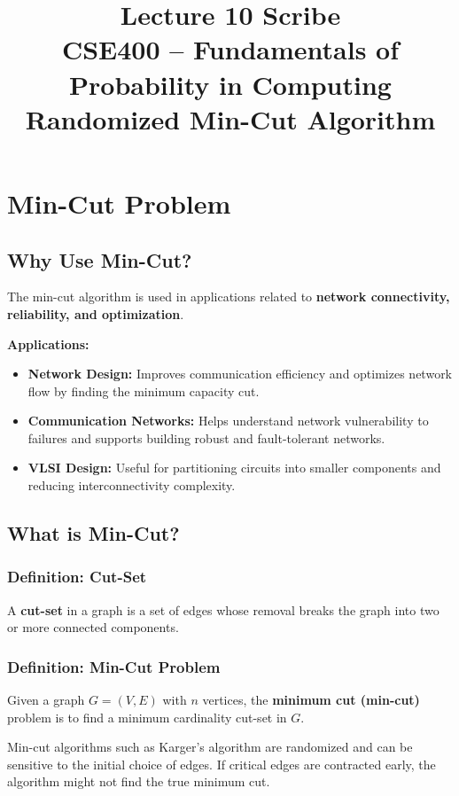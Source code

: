 \documentclass[12pt]{article}
\title{\textbf{Lecture 10 Scribe}\\
CSE400 -- Fundamentals of Probability in Computing\\
\large Randomized Min-Cut Algorithm}
\author{}
\date{}
\begin{document}
\maketitle

\section{Min-Cut Problem}

\subsection{Why Use Min-Cut?}

The min-cut algorithm is used in applications related to \textbf{network connectivity, reliability, and optimization}.

\textbf{Applications:}
\begin{itemize}
    \item \textbf{Network Design:} Improves communication efficiency and optimizes network flow by finding the minimum capacity cut.
    \item \textbf{Communication Networks:} Helps understand network vulnerability to failures and supports building robust and fault-tolerant networks.
    \item \textbf{VLSI Design:} Useful for partitioning circuits into smaller components and reducing interconnectivity complexity.
\end{itemize}

\subsection{What is Min-Cut?}

\subsubsection*{Definition: Cut-Set}
A \textbf{cut-set} in a graph is a set of edges whose removal breaks the graph into two or more connected components.

\subsubsection*{Definition: Min-Cut Problem}
Given a graph $G=(V,E)$ with $n$ vertices, the \textbf{minimum cut (min-cut)} problem is to find a minimum cardinality cut-set in $G$.

Min-cut algorithms such as Karger’s algorithm are randomized and can be sensitive to the initial choice of edges. If critical edges are contracted early, the algorithm might not find the true minimum cut.
\end{document}
